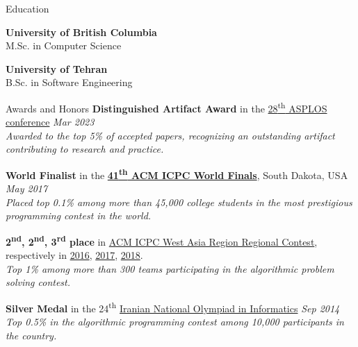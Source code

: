 \documentclass[
	10pt, %
]{resume} %
\begin{document}
\begin{rSection}{Education}
	
  \textbf{University of British Columbia} \\ %
	M.Sc. in Computer Science

  \textbf{University of Tehran} \\ %
  B.Sc. in Software Engineering
\end{rSection}


\begin{rSection}{Awards and Honors}
  {\bf Distinguished Artifact Award} in the
  \href{https://asplos-conference.org/asplos2023/index.html}{28\textsuperscript{th} ASPLOS conference} \hfill \textit{Mar 2023}
  \\ \textit{Awarded to the top 5\% of accepted papers, recognizing an outstanding artifact contributing to research and practice.}


	\item {\bf World Finalist} in the
    \href{https://icpc.global/community/results-2017}{\textbf{41\textsuperscript{th} ACM ICPC World Finals}}, South Dakota, USA \hfill \textit{May 2017}
  \\ \textit{Placed top 0.1\% among more than 45,000 college students in the most prestigious programming contest in the world.}

	{\bf 2\textsuperscript{nd}, 2\textsuperscript{nd}, 3\textsuperscript{rd} place} in 
      \href{https://icpc.ir/}{ACM ICPC West Asia Region Regional Contest}, respectively in
      \href{http://icpc.sharif.edu/acmicpc16/scoreboard/}{2016},
      \href{http://icpc.sharif.edu/acmicpc17/scoreboard/}{2017},
      \href{http://icpc.sharif.edu/acmicpc18/scoreboard/}{2018}.
	\\ \textit{Top 1\% among more than 300 teams participating in the algorithmic
        problem solving contest.}

	{\bf Silver Medal} in the 24\textsuperscript{th} \href{http://inoi.ir/}
  {Iranian National Olympiad in Informatics} \hfill \textit{Sep 2014}
	\\ \textit{Top 0.5\% in the algorithmic programming contest among 10,000 participants in the country.}

\end{rSection}
\end{document}
